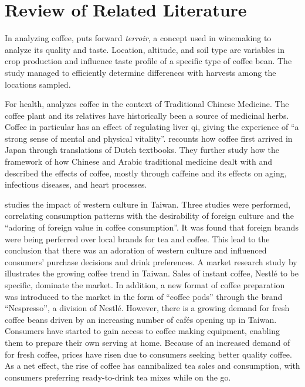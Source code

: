 \section{Review of Related Literature}\label{sec:rrl}

In analyzing coffee, \textcite{silva_characterization_2014} puts forward
\emph{terroir}, a concept used in winemaking to analyze its quality and taste.
Location, altitude, and soil type are variables in crop production and influence
taste profile of a specific type of coffee bean. The study managed to
efficiently determine differences with harvests among the locations sampled.

For health, \textcite{dharmananda_coffee_2003} analyzes coffee in the context of
Traditional Chinese Medicine. The coffee plant and its relatives have
historically been a source of medicinal herbs. Coffee in particular has an
effect of regulating liver qi, giving the experience of ``a strong sense of
mental and physical vitality''. \textcite{namba_historical_2001} recounts how
coffee first arrived in Japan through translations of Dutch textbooks. They
further study how the framework of how Chinese and Arabic traditional medicine
dealt with and described the effects of coffee, mostly through caffeine and its
effects on aging, infectious diseases, and heart processes.

\textcite{su_impact_2006} studies the impact of western culture in Taiwan. Three
studies were performed, correlating consumption patterns with the desirability
of foreign culture and the ``adoring of foreign value in coffee consumption''.
It was found that foreign brands were being perferred over local brands for tea
and coffee. This lead to the conclusion that there was an adoration of western
culture and influenced consumers' purchase decisions and drink preferences. A
market research study by \textcite{euromonitor_international_coffee_2015}
illustrates the growing coffee trend in Taiwan. Sales of instant coffee, Nestlé
to be specific, dominate the market. In addition, a new format of coffee
preparation was introduced to the market in the form of ``coffee pods'' through
the brand ``Nespresso'', a division of Nestlé. However, there is a growing
demand for fresh coffee beans driven by an increasing number of cafés opening up
in Taiwan. Consumers have started to gain access to coffee making equipment,
enabling them to prepare their own serving at home. Because of an increased
demand of for fresh coffee, prices have risen due to consumers seeking better
quality coffee. As a net effect, the rise of coffee has cannibalized tea sales
and consumption, with consumers preferring ready-to-drink tea mixes while on the
go.

